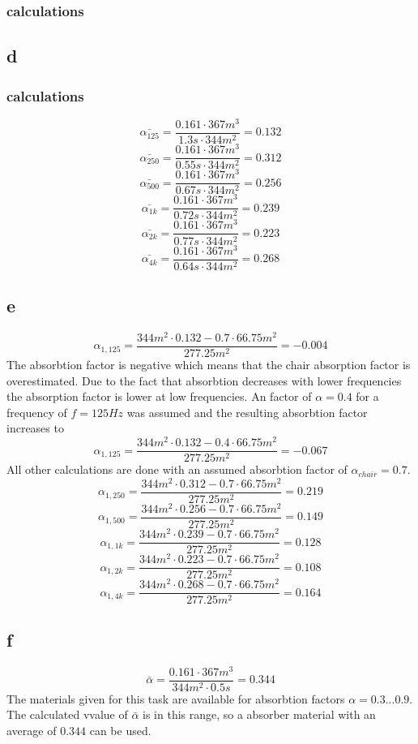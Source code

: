 \documentclass{article}
\begin{document}
\subsubsection{calculations}

\subsection{d}
\subsubsection{calculations}
$$\bar{\alpha_{125}}=\frac{0.161\cdot 367m^3}{1.3s\cdot 344m^2}=0.132$$
$$\bar{\alpha_{250}}=\frac{0.161\cdot 367m^3}{0.55s\cdot 344m^2}=0.312$$
$$\bar{\alpha_{500}}=\frac{0.161\cdot 367m^3}{0.67s\cdot 344m^2}=0.256$$
$$\bar{\alpha_{1k}}=\frac{0.161\cdot 367m^3}{0.72s\cdot 344m^2}=0.239$$
$$\bar{\alpha_{2k}}=\frac{0.161\cdot 367m^3}{0.77s\cdot 344m^2}=0.223$$
$$\bar{\alpha_{4k}}=\frac{0.161\cdot 367m^3}{0.64s\cdot 344m^2}=0.268$$
\subsection{e}
$$\alpha_{1,125}=\frac{344m^2\cdot 0.132-0.7\cdot 66.75m^2}{277.25m^2}=-0.004$$
The absorbtion factor is negative which means that the chair absorption factor is overestimated. Due to the fact that absorbtion decreases with lower frequencies the absorption factor is lower at low frequencies.  An factor of $\alpha=0.4$ for a frequency of $f=125Hz$ was assumed and the resulting absorbtion factor increases to
 $$\alpha_{1,125}=\frac{344m^2\cdot 0.132-0.4\cdot 66.75m^2}{277.25m^2}=-0.067$$
All other calculations are done with an assumed absorbtion factor of $\alpha_{chair}=0.7$.
 $$\alpha_{1,250}=\frac{344m^2\cdot 0.312-0.7\cdot 66.75m^2}{277.25m^2}=0.219$$
 $$\alpha_{1,500}=\frac{344m^2\cdot 0.256-0.7\cdot 66.75m^2}{277.25m^2}=0.149$$
 $$\alpha_{1,1k}=\frac{344m^2\cdot 0.239-0.7\cdot 66.75m^2}{277.25m^2}=0.128$$
 $$\alpha_{1,2k}=\frac{344m^2\cdot 0.223-0.7\cdot 66.75m^2}{277.25m^2}=0.108$$
 $$\alpha_{1,4k}=\frac{344m^2\cdot 0.268-0.7\cdot 66.75m^2}{277.25m^2}=0.164$$
\subsection{f}
$$\bar{\alpha}=\frac{0.161\cdot 367m^3}{344m^2\cdot 0.5s}=0.344$$
The materials given for this task are available for absorbtion factors $\alpha=0.3 ... 0.9$. The calculated vvalue of $\bar{\alpha}$ is in this range, so a absorber material with an average of $0.344$ can be used.
\end{document}

